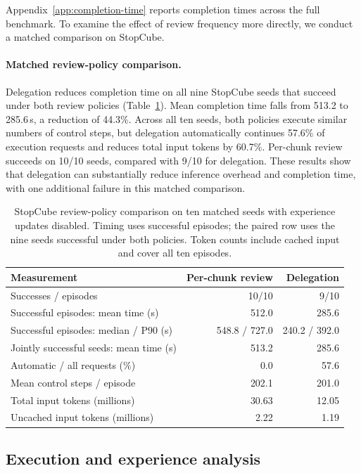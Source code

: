 Appendix~\ref{app:completion-time} reports completion times across the full benchmark. To examine the effect of review frequency more directly, we conduct a matched comparison on StopCube.

\paragraph{Matched review-policy comparison.}
Delegation reduces completion time on all nine StopCube seeds that succeed under both review policies (Table~\ref{tab:paired}). Mean completion time falls from 513.2 to 285.6\,s, a reduction of 44.3\%. Across all ten seeds, both policies execute similar numbers of control steps, but delegation automatically continues 57.6\% of execution requests and reduces total input tokens by 60.7\%. Per-chunk review succeeds on 10/10 seeds, compared with 9/10 for delegation. These results show that delegation can substantially reduce inference overhead and completion time, with one additional failure in this matched comparison.

\begin{table}[!htbp]
\centering
\caption{StopCube review-policy comparison on ten matched seeds with experience updates disabled. Timing uses successful episodes; the paired row uses the nine seeds successful under both policies. Token counts include cached input and cover all ten episodes.}
\label{tab:paired}
\small
\begin{tabularx}{\linewidth}{@{}Xrr@{}}
\toprule
Measurement & Per-chunk review & Delegation \\
\midrule
Successes / episodes & 10/10 & 9/10 \\
Successful episodes: mean time (s) & 512.0 & 285.6 \\
Successful episodes: median / P90 (s) & 548.8 / 727.0 & 240.2 / 392.0 \\
Jointly successful seeds: mean time (s) & 513.2 & 285.6 \\
Automatic / all requests (\%) & 0.0 & 57.6 \\
Mean control steps / episode & 202.1 & 201.0 \\
Total input tokens (millions) & 30.63 & 12.05 \\
Uncached input tokens (millions) & 2.22 & 1.19 \\
\bottomrule
\end{tabularx}
\end{table}

\FloatBarrier

\subsection{Execution and experience analysis}

